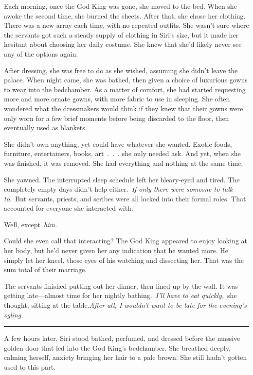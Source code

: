 Each morning, once the God King was gone, she moved to the bed. When she awoke the second time, she burned the sheets. After that, she chose her clothing. There was a new array each time, with no repeated outfits. She wasn’t sure where the servants got such a steady supply of clothing in Siri’s size, but it made her hesitant about choosing her daily costume. She knew that she’d likely never see any of the options again.

After dressing, she was free to do as she wished, assuming she didn’t leave the palace. When night came, she was bathed, then given a choice of luxurious gowns to wear into the bedchamber. As a matter of comfort, she had started requesting more and more ornate gowns, with more fabric to use in sleeping. She often wondered what the dressmakers would think if they knew that their gowns were only worn for a few brief moments before being discarded to the floor, then eventually used as blankets.

She didn’t own anything, yet could have whatever she wanted. Exotic foods, furniture, entertainers, books, art~.~.~. she only needed ask. And yet, when she was finished, it was removed. She had everything and nothing at the same time.

She yawned. The interrupted sleep schedule left her bleary-eyed and tired. The completely empty days didn’t help either.~\textit{If only there were someone to talk to.}~But servants, priests, and scribes were all locked into their formal roles. That accounted for everyone she interacted with.

Well, except~\textit{him.}

Could she even call that interacting? The God King appeared to enjoy looking at her body, but he’d never given her any indication that he wanted more. He simply let her kneel, those eyes of his watching and dissecting her. That was the sum total of their marriage.

The servants finished putting out her dinner, then lined up by the wall. It was getting late—almost time for her nightly bathing.~\textit{I’ll have to eat quickly,}~she thought, sitting at the table.\textit{After all, I wouldn’t want to be late for the evening’s ogling.}

\bigskip \hrule \bigskip

A few hours later, Siri stood bathed, perfumed, and dressed before the massive golden door that led into the God King’s bedchamber. She breathed deeply, calming herself, anxiety bringing her hair to a pale brown. She still hadn’t gotten used to this part.

